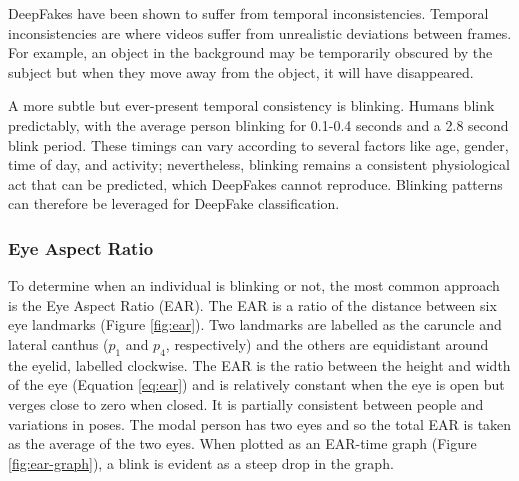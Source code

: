 DeepFakes have been shown to suffer from temporal inconsistencies\cite{juefei2022countering}. Temporal inconsistencies are where videos suffer from unrealistic deviations between frames. For example, an object in the background may be temporarily obscured by the subject but when they move away from the object, it will have disappeared. 

A more subtle but ever-present temporal consistency is blinking. Humans blink predictably, with the average person blinking for 0.1-0.4 seconds and a 2.8 second blink period\cite{schiffman1990sensation}. These timings can vary according to several factors like age, gender, time of day, and activity\cite{jung2020deepvision}; nevertheless, blinking remains a consistent physiological act that can be predicted, which DeepFakes cannot reproduce. Blinking patterns can therefore be leveraged for DeepFake classification.

\subsubsection{Eye Aspect Ratio}

To determine when an individual is blinking or not, the most common approach is the Eye Aspect Ratio (EAR)\cite{soukupova2016eye}. The EAR is a ratio of the distance between six eye landmarks (Figure \ref{fig:ear}). Two landmarks are labelled as the caruncle and lateral canthus ($p_1$ and $p_4$, respectively) and the others are equidistant around the eyelid, labelled clockwise. The EAR is the ratio between the height and width of the eye (Equation \ref{eq:ear}) and is relatively constant when the eye is open but verges close to zero when closed. It is partially consistent between people and variations in poses. The modal person has two eyes and so the total EAR is taken as the average of the two eyes. When plotted as an EAR-time graph (Figure \ref{fig:ear-graph}), a blink is evident as a steep drop in the graph. 

